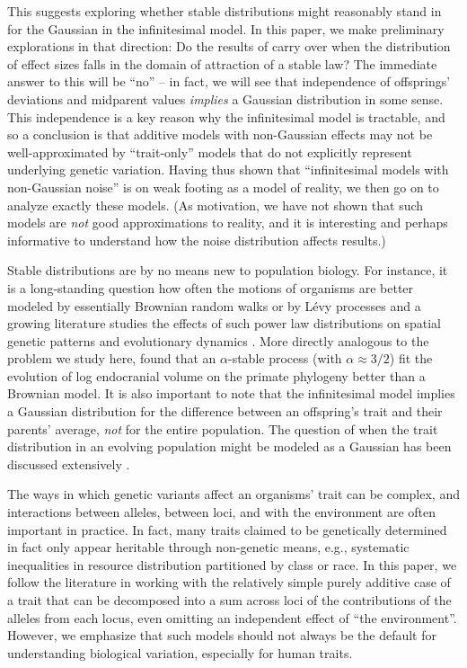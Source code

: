 \documentclass{article}
\newcommand{\1}{\mathbbm{1}}
\theoremstyle{remark}
\theoremstyle{definition}
\begin{document}
This suggests exploring whether stable distributions might reasonably stand in for the Gaussian
in the infinitesimal model.
In this paper, we make preliminary explorations in that direction:
Do the results of \citet{barton2017infinitesimal}
carry over when the distribution of effect sizes falls in the domain of attraction of a stable law?
The immediate answer to this will be ``no'' --
in fact, we will see that independence of offsprings' deviations and midparent values \emph{implies} a Gaussian distribution in some sense.
This independence is a key reason why the infinitesimal model is tractable,
and so a conclusion is that additive models with non-Gaussian effects may not be well-approximated
by ``trait-only'' models that do not explicitly represent underlying genetic variation.
Having thus shown that ``infinitesimal models with non-Gaussian noise'' is on weak footing as a model of reality,
we then go on to analyze exactly these models.
(As motivation,
we have not shown that such models are \emph{not} good approximations to reality,
and it is interesting and perhaps informative to understand how the noise distribution affects results.)

Stable distributions are by no means new to population biology.
For instance, it is a long-standing question how often the motions of organisms
are better modeled by essentially Brownian random walks or by L\'evy processes \citep{benhamou2007animals}
and a growing literature studies the effects of such power law distributions
on spatial genetic patterns and evolutionary dynamics
\citep[e.g.,][]{paulose2019spatial,smith2023isolation}.
More directly analogous to the problem we study here, \citet{landis2012phylogenetic}
found that an $\alpha$-stable process (with $\alpha \approx 3/2$) fit the evolution of log endocranial volume
on the primate phylogeny
better than a Brownian model.
It is also important to note that
the infinitesimal model implies a Gaussian distribution for the difference between an offspring's trait and their parents' average,
\emph{not} for the entire population.
The question of when the trait distribution in an evolving population
might be modeled as a Gaussian has been discussed extensively
\citep[e.g.,][]{turelli1994genetic,dbarre2015evolution}.

The ways in which genetic variants affect an organisms' trait can be complex,
and interactions between alleles, between loci, and with the environment are often important in practice.
In fact, many traits claimed to be genetically determined
in fact only appear heritable through non-genetic means,
e.g., systematic inequalities in resource distribution partitioned by class or race.
In this paper, we follow the literature in working with the relatively simple purely additive case
of a trait that can be decomposed into a sum across loci of the contributions of the alleles from each locus,
even omitting an independent effect of ``the environment''.
However, we emphasize that such models should not always be the default for understanding biological variation,
especially for human traits.
\end{document}
